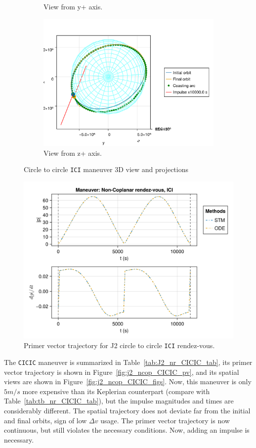 \begin{figure}[htbp]
\begin{subfigure}{0.49\linewidth}
        \caption{View from y+ axis.}
    \end{subfigure}
    \begin{subfigure}{0.49\linewidth}
        \includegraphics[width=0.8\linewidth]{../results/j2/ipv_noncop/ICI_z+.png}
        \caption{View from z+ axis.}
    \end{subfigure}
    \caption{Circle to circle \texttt{ICI} maneuver 3D view and projections}
    \label{fig:j2_ncop_ICI_figs}
\end{figure}

\begin{figure}[htbp]
    \centering
    \includegraphics[width=0.7\linewidth]{../results/j2/ipv_noncop/ICI_primer_vector.png}
    \caption{Primer vector trajectory for J2 circle to circle \texttt{ICI} rendez-vous.}
    \label{fig:j2_ncop_ICI_pv}
\end{figure}
\FloatBarrier
The \texttt{CICIC} maneuver is summarized in Table~\ref{tab:J2_nr_CICIC_tab}, its primer vector trajectory is shown in Figure~\ref{fig:j2_ncop_CICIC_pv}, and its spatial views are shown in Figure~\ref{fig:j2_ncop_CICIC_figs}. Now, this maneuver is only \(5 m/s\) more expensive than its Keplerian counterpart (compare with Table~\ref{tab:tb_nr_CICIC_tab}), but the impulse magnitudes and times are considerably different. The spatial trajectory does not deviate far from the initial and final orbits, sign of low \(\Delta v\) usage. The primer vector trajectory is now continuous, but still violates the necessary conditions. Now, adding an impulse is necessary.

